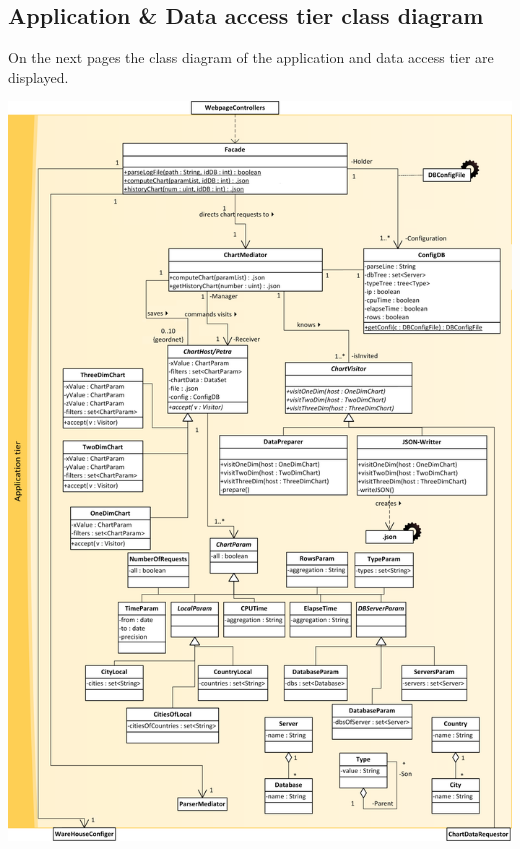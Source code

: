 \subsection{Application \& Data access tier class diagram}
On the next pages the class diagram of the application and data access tier are displayed. 
\newpage
\begin{center}
\includegraphics[width=0.9\linewidth]{Pictures/AppTierDia1.png}
\end{center}  

